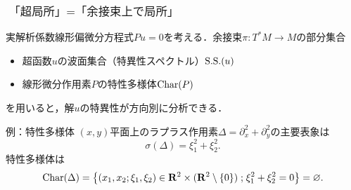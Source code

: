 \documentclass[dvipdfmx,10pt,aspectratio=169,leqno]{beamer}%
\newcommand{\rr}{\mathbf{R}}
\newcommand{\kk}{\mathbf{k}}
\numberwithin{equation}{subsection}
\newcommand{\Dompb}{\mathop{\mathsf{D}^\mathrm{b}}\nolimits}
\newcommand{\muS}[1][]{\mathop{\mathrm{SS}}\nolimits_{#1}}
\newcommand{\cotb}[1][]{T^{\ast}{#1}}
\theoremstyle{mystyle}
\newtheorem{THM}[AXM]{定理}
\newcommand{\smid}{\mathrel{;}}
\begin{document}
\begin{frame}
  \frametitle{\(\text{「超局所」}=\text{「余接束上で局所」}\)}

  実解析係数線形偏微分方程式\(Pu=0\)を考える．余接束\(\pi\colon\cotb[M]\to M\)の部分集合
  \begin{itemize}
    \item 超函数\(u\)の波面集合（特異性スペクトル）\(\mathop{\mathrm{S.S.}}\nolimits(u)\)
    \item 線形微分作用素\(P\)の特性多様体\(\mathop{\mathrm{Char}}\nolimits(P)\)
  \end{itemize}
  を用いると，解\(u\)の特異性が方向別に分析できる．
  \pause

  \begin{exampleblock}{例：特性多様体}
    \((x,y)\)平面上のラプラス作用素\(
      \Delta=\partial^2_x+\partial^2_y
    \)の主要表象は\[
      \sigma(\Delta)=\xi_1^2+\xi_2^2.
    \]
    特性多様体は\[
      \Char(\Delta)
      =\left\{
        (x_1,x_2;\xi_1,\xi_2)
        \in \rr^{2}\times(\rr^2\setminus \{0\})
        \smid\xi_1^2+\xi_2^2=0
      \right\}
      =\varnothing.
    \]
  \end{exampleblock}

\end{frame}

\end{document}
